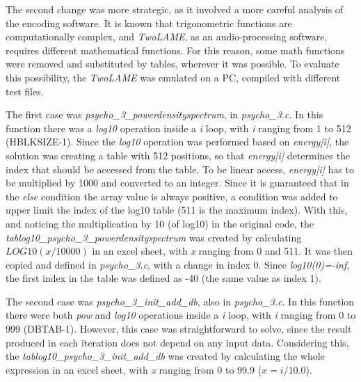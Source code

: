 The second change was more strategic, as it involved a more careful analysis of the encoding software. It is known that trigonometric functions are computationally complex, and \textit{TwoLAME}, as an audio-processing software, requires different mathematical functions. For this reason, some math functions were removed and substituted by tables, wherever it was possible. To evaluate this possibility, the \textit{TwoLAME} was emulated on a PC, compiled with different test files.

The first case was \textit{psycho\_3\_powerdensityspectrum}, in \textit{psycho\_3.c}. In this function there was a \textit{log10} operation inside a \textit{i} loop, with \textit{i} ranging from 1 to 512 (HBLKSIZE-1). Since the \textit{log10} operation was performed based on \textit{energy[i]}, the solution was creating a table with 512 positions, so that \textit{energy[i]} determines the index that should be accessed from the table. To be linear access, \textit{energy[i]} has to be multiplied by 1000 and converted to an integer. Since it is guaranteed that in the \textit{else} condition the array value is always positive, a condition was added to upper limit the index of the log10 table (511 is the maximum index). With this, and noticing the multiplication by 10 (of log10) in the original code, the \textit{tablog10\_psycho\_3\_powerdensityspectrum} was created by calculating $LOG10(x/10000)$ in an excel sheet, with \textit{x} ranging from 0 and 511. It was then copied and defined in \textit{psycho\_3.c}, with a change in index 0. Since \textit{log10(0)=-inf}, the first index in the table was defined as -40 (the same value as index 1).

\begin{comment}
\begin{figure}[H]
\centerline{\fbox{\texttt{[image: powerdensityspectrum.pdf]}}}
\caption{\textit{psycho\_3\_powerdensityspectrum} function.}
\label{powerdensityspectrum}
\end{figure}
\end{comment}


The second case was \textit{psycho\_3\_init\_add\_db}, also in \textit{psycho\_3.c}. In this function there were both \textit{pow} and \textit{log10} operations inside a \textit{i} loop, with \textit{i} ranging from 0 to 999 (DBTAB-1). However, this case was straightforward to solve, since the result produced in each iteration does not depend on any input data. Considering this, the \textit{tablog10\_psycho\_3\_init\_add\_db} was created by calculating the whole expression in an excel sheet, with \textit{x} ranging from 0 to 99.9 ($x=i/10.0$).

